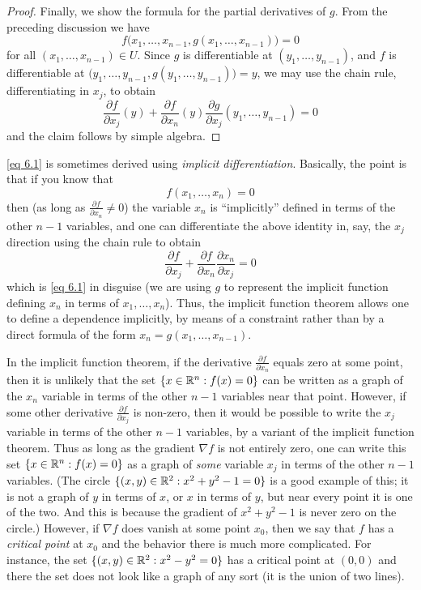 \begin{proof}
  Finally, we show the formula for the partial derivatives of \(g\).
  From the preceding discussion we have
  \[
    f\big(x_1, \dots, x_{n - 1}, g(x_1, \dots, x_{n - 1})\big) = 0
  \]
  for all \((x_1, \dots, x_{n - 1}) \in U\).
  Since \(g\) is differentiable at \((y_1, \dots, y_{n - 1})\), and \(f\) is differentiable at \(\big(y_1, \dots, y_{n - 1}, g(y_1, \dots, y_{n - 1})\big) = y\), we may use the chain rule, differentiating in \(x_j\), to obtain
  \[
    \frac{\partial f}{\partial x_j}(y) + \frac{\partial f}{\partial x_n}(y) \frac{\partial g}{\partial x_j}(y_1, \dots, y_{n - 1}) = 0
  \]
  and the claim follows by simple algebra.
\end{proof}

\begin{rmk}\label{6.8.2}
  \cref{eq 6.1} is sometimes derived using \emph{implicit differentiation}.
  Basically, the point is that if you know that
  \[
    f(x_1, \dots, x_n) = 0
  \]
  then (as long as \(\frac{\partial f}{\partial x_n} \neq 0\)) the variable \(x_n\) is ``implicitly'' defined in terms of the other \(n - 1\) variables, and one can differentiate the above identity in, say, the \(x_j\) direction using the chain rule to obtain
  \[
    \frac{\partial f}{\partial x_j} + \frac{\partial f}{\partial x_n} \frac{\partial x_n}{\partial x_j} = 0
  \]
  which is \cref{eq 6.1} in disguise
  (we are using \(g\) to represent the implicit function defining \(x_n\) in terms of \(x_1, \dots, x_n\)).
  Thus, the implicit function theorem allows one to define a dependence implicitly, by means of a constraint rather than by a direct formula of the form \(x_n = g(x_1, \dots, x_{n - 1})\).
\end{rmk}

\begin{note}
  In the implicit function theorem, if the derivative \(\frac{\partial f}{\partial x_n}\) equals zero at some point, then it is unlikely that the set \(\{x \in \mathbb{R}^n : f(x) = 0\}\) can be written as a graph of the \(x_n\) variable in terms of the other \(n - 1\) variables near that point.
  However, if some other derivative \(\frac{\partial f}{\partial x_j}\) is non-zero, then it would be possible to write the \(x_j\) variable in terms of the other \(n - 1\) variables, by a variant of the implicit function theorem.
  Thus as long as the gradient \(\nabla f\) is not entirely zero, one can write this set \(\{x \in \mathbb{R}^n : f(x) = 0\}\) as a graph of \emph{some} variable \(x_j\) in terms of the other \(n - 1\) variables.
  (The circle \(\{(x, y) \in \mathbb{R}^2 : x^2 + y^2 - 1 = 0\}\) is a good example of this;
  it is not a graph of \(y\) in terms of \(x\), or \(x\) in terms of \(y\), but near every point it is one of the two.
  And this is because the gradient of \(x^2 + y^2 - 1\) is never zero on the circle.)
  However, if \(\nabla f\) does vanish at some point \(x_0\), then we say that \(f\) has a \emph{critical point} at \(x_0\) and the behavior there is much more complicated.
  For instance, the set \(\{(x, y) \in \mathbb{R}^2 : x^2 - y^2 = 0\}\) has a critical point at \((0, 0)\) and there the set does not look like a graph of any sort
  (it is the union of two lines).
\end{note}

